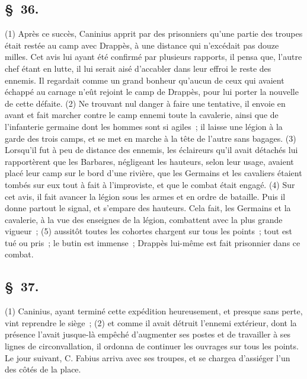 \documentclass[french,twoside]{book} %
\begin{document}
\subsection[{§ 36.}]{ \textsc{§ 36.} }
\noindent (1) Après ce succès, Caninius apprit par des prisonniers qu’une partie des troupes était restée au camp avec Drappès, à une distance qui n’excédait pas douze milles. Cet avis lui ayant été confirmé par plusieurs rapports, il pensa que, l’autre chef étant en lutte, il lui serait aisé d’accabler dans leur effroi le reste des ennemis. Il regardait comme un grand bonheur qu’aucun de ceux qui avaient échappé au carnage n’eût rejoint le camp de Drappès, pour lui porter la nouvelle de cette défaite. (2) Ne trouvant nul danger à faire une tentative, il envoie en avant et fait marcher contre le camp ennemi toute la cavalerie, ainsi que de l’infanterie germaine dont les hommes sont si agiles ; il laisse une légion à la garde des trois camps, et se met en marche à la tête de l’autre sans bagages. (3) Lorsqu’il fut à peu de distance des ennemis, les éclaireurs qu’il avait détachés lui rapportèrent que les Barbares, négligeant les hauteurs, selon leur usage, avaient placé leur camp sur le bord d’une rivière, que les Germains et les cavaliers étaient tombés sur eux tout à fait à l’improviste, et que le combat était engagé. (4) Sur cet avis, il fait avancer la légion sous les armes et en ordre de bataille. Puis il donne partout le signal, et s’empare des hauteurs. Cela fait, les Germains et la cavalerie, à la vue des enseignes de la légion, combattent avec la plus grande vigueur ; (5) aussitôt toutes les cohortes chargent sur tous les points ; tout est tué ou pris ; le butin est immense ; Drappès lui-même est fait prisonnier dans ce combat.
\subsection[{§ 37.}]{ \textsc{§ 37.} }
\noindent (1) Caninius, ayant terminé cette expédition heureusement, et presque sans perte, vint reprendre le siège ; (2) et comme il avait détruit l’ennemi extérieur, dont la présence l’avait jusque-là empêché d’augmenter ses postes et de travailler à ses lignes de circonvallation, il ordonna de continuer les ouvrages sur tous les points. Le jour suivant, C. Fabius arriva avec ses troupes, et se chargea d’assiéger l’un des côtés de la place.
\end{document}

